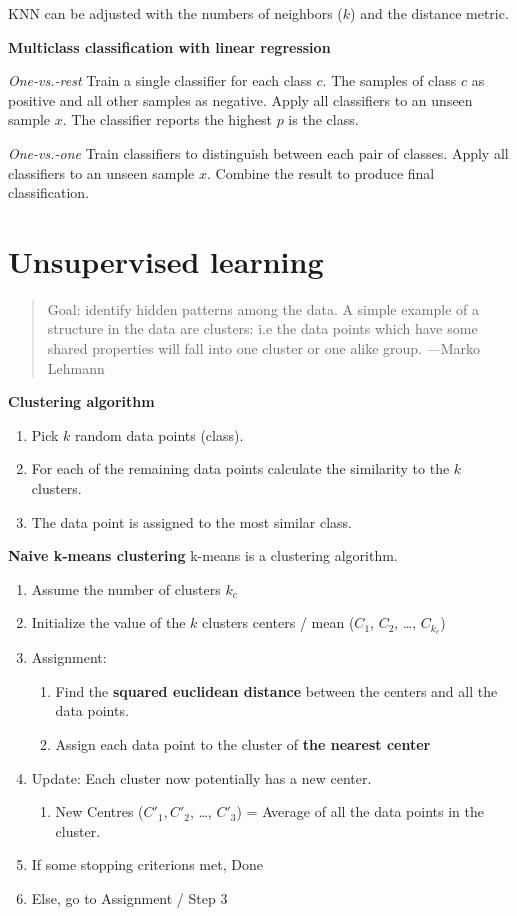 \documentclass[11pt,twoside,landscape]{article}
\begin{document}
\begin{multicols}{3}
KNN can be adjusted with the numbers of neighbors (\(k\)) and the distance metric.


\textbf{Multiclass classification with linear regression}

\emph{One-vs.-rest}
Train a single classifier for each class \(c\).
The samples of class \(c\) as positive and all other samples as negative.
Apply all classifiers to an unseen sample \(x\).
The classifier reports the highest \(p\) is the class.


\emph{One-vs.-one}
Train classifiers to distinguish between each pair of classes.
Apply all classifiers to an unseen sample \(x\).
Combine the result to produce final classification.

\section{Unsupervised learning}
\label{sec:orge1144e7}
\begin{quote}
Goal: identify hidden patterns among the data.
A simple example of a structure in the data
are clusters: i.e the data points which
have some shared properties will fall into
one cluster or one alike group. ---Marko Lehmann
\end{quote}


\textbf{Clustering algorithm}
\begin{enumerate}
\item Pick \(k\) random data points (class).
\item For each of the remaining data points calculate the similarity to the \(k\) clusters.
\item The data point is assigned to the most similar class.
\end{enumerate}


\textbf{Naive k-means clustering}
k-means is a clustering algorithm.

\begin{enumerate}
\item Assume the number of clusters \(k_c\)
\item Initialize the value of the \(k\) clusters centers / mean (\(C_1\), \(C_2\), \ldots{}, \(C_{k_c}\))
\item Assignment:
\begin{enumerate}
\item Find the \textbf{squared euclidean distance} between the centers and all the data points.
\item Assign each data point to the cluster of \textbf{the nearest center}
\end{enumerate}
\item Update: Each cluster now potentially has a new center.
\begin{enumerate}
\item New Centres (\(C'_1, C'_2\), \ldots{}, \(C'_3\)) = Average of all the data points in the cluster.
\end{enumerate}
\item If some stopping criterions met, Done
\item Else, go to Assignment / Step 3
\end{enumerate}



\end{multicols}
\end{document}
